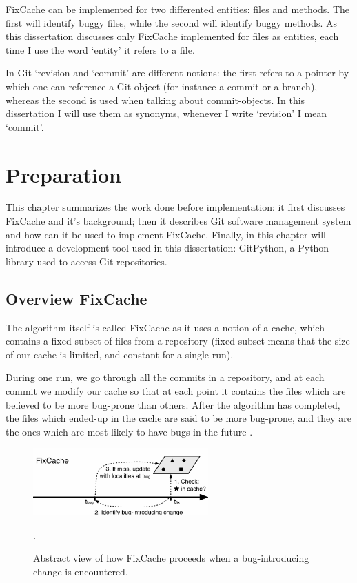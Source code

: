\documentclass[12pt,twoside,notitlepage]{report}
\newcommand{\fxch}{FixCache}
\begin{document}
\fxch{} can be implemented for two differented entities: files and methods. The first will identify buggy files, while the second will identify buggy methods. As this dissertation discusses only \fxch{} implemented for files as entities, each time I use the word `entity' it refers to a file.

In Git `revision and `commit' are different notions: the first refers to a pointer by which one can reference a Git object (for instance a commit or a branch), whereas the second is used when talking about commit-objects. In this dissertation I will use them as synonyms, whenever I write `revision' I mean `commit'.
\cleardoublepage
\chapter{Preparation}
This chapter summarizes the work done before implementation: it first discusses \fxch{} and it's background; then it describes Git \cite{TorvaldsGit} software management system and how can it be used to implement \fxch{}. Finally, in this chapter will introduce a development tool used in this dissertation: GitPython, a Python library used to access Git repositories.
\section{Overview \fxch{}}
The algorithm itself is called \fxch{} as it uses a notion of a cache, which contains a fixed subset of files from a repository (fixed subset means that the size of our cache is limited, and constant for a single run). 

During one run, we go through all the commits in a repository, and at each commit we modify our cache so that at each point it contains the files which are believed to be more bug-prone than others. After the algorithm has completed, the files which ended-up in the cache are said to be more bug-prone, and they are the ones which are most likely to have bugs in the future \cite{FixCache}.
\clearpage
\begin{figure}[h]
\includegraphics[width=0.6\textwidth]{fixcache_figure.png}
\centering
\captionsetup{width=0.6\textwidth}
\caption{Abstract view of how \fxch{} proceeds when a bug-introducing change is encountered.}.
\label{fixcache_figure}
\end{figure}
\end{document}
